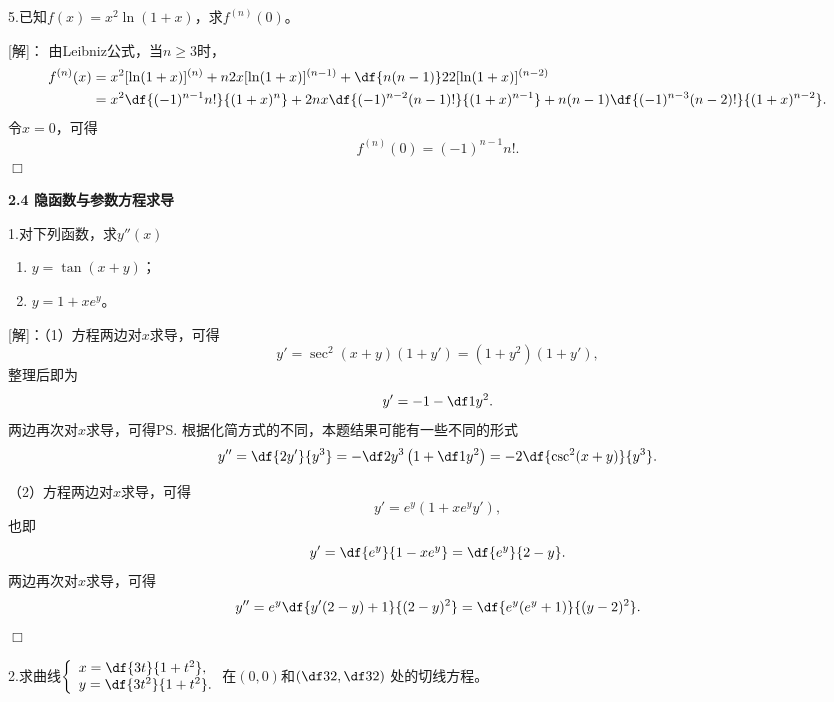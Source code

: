\bigskip

5.已知$f(x)=x^2\ln(1+x)$，求$f^{(n)}(0)$。

[解]：
由Leibniz公式，当$n\geq3$时，
\begin{align*}
	f^{(n)}(x)&=x^2[\ln(1+x)]^{(n)}+n2x[\ln(1+x)]^{(n-1)}
	+\df{n(n-1)}22[\ln(1+x)]^{(n-2)}\\
	&=x^2\df{(-1)^{n-1}n!}{(1+x)^n}+2nx\df{(-1)^{n-2}(n-1)!}{(1+x)^{n-1}}
	+n(n-1)\df{(-1)^{n-3}(n-2)!}{(1+x)^{n-2}}.
\end{align*}
令$x=0$，可得
$$f^{(n)}(0)=(-1)^{n-1}n!.$$
\hfill$\Box$

\begin{center}
	\bf 2.4 隐函数与参数方程求导
\end{center}

\bigskip

1.对下列函数，求$y''(x)$
  \begin{enumerate}[(1)]
    \setlength{\itemindent}{1cm}
    \item $y=\tan(x+y)$；
    \item $y=1+xe^y$。
  \end{enumerate}

[解]：（1）方程两边对$x$求导，可得
$$y'=\sec^2(x+y)(1+y')=(1+y^2)(1+y'),$$
整理后即为
$$y'=-1-\df1{y^2}.$$
两边再次对$x$求导，可得\ps{根据化简方式的不同，本题结果可能有一些不同的形式}
$$y''=\df{2y'}{y^3}=-\df2{y^3}\left(1+\df1{y^2}\right)
=-2\df{\csc^2(x+y)}{y^3}.$$

（2）方程两边对$x$求导，可得
$$y'=e^y(1+xe^yy'),$$
也即
$$y'=\df{e^y}{1-xe^y}=\df{e^y}{2-y}.$$
两边再次对$x$求导，可得
$$y''=e^y\df{y'(2-y)+1}{(2-y)^2}=\df{e^y(e^y+1)}{(y-2)^2}.$$
\hfill$\Box$

\bigskip

2.求曲线$\left\{\begin{array}{l}
x=\df{3t}{1+t^2},\\ y=\df{3t^2}{1+t^2}.
\end{array}\right.$在$(0,0)$和$\left(\df32,\df32\right)$
处的切线方程。

